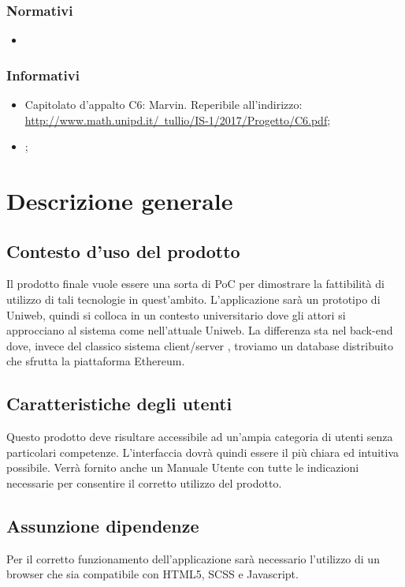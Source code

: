 \subsubsection{Normativi}
\begin{itemize}
	\item \textcolor{red}\NdP
\end{itemize}

\subsubsection{Informativi}
\begin{itemize}
	\item Capitolato d'appalto C6: Marvin. Reperibile all'indirizzo:\\ 
	\href{http://www.math.unipd.it/~tullio/IS-1/2017/Progetto/C6.pdf}{http://www.math.unipd.it/~tullio/IS-1/2017/Progetto/C6.pdf};
	\item \textcolor{red}\SdF;
\end{itemize}


\section{Descrizione generale}
	\subsection{Contesto d'uso del prodotto}
	Il prodotto finale vuole essere una sorta di PoC per dimostrare la fattibilità di utilizzo di tali tecnologie in
	quest’ambito. L’applicazione sarà un prototipo di Uniweb, quindi si colloca in un contesto universitario dove
	gli attori si approcciano al sistema come nell’attuale Uniweb. La differenza sta nel back-end dove, invece
	del classico sistema client/server , troviamo un database distribuito che sfrutta la piattaforma Ethereum.
	
	\subsection{Caratteristiche degli utenti}
	Questo prodotto deve risultare accessibile ad un'ampia categoria di utenti senza particolari competenze. L’interfaccia dovrà quindi essere il più chiara ed intuitiva possibile. Verrà fornito anche un Manuale Utente con tutte le indicazioni necessarie per consentire il corretto utilizzo del prodotto.
	
	\subsection{Assunzione dipendenze}
	Per il corretto funzionamento dell’applicazione sarà necessario l’utilizzo di un browser che sia compatibile con HTML5, SCSS e Javascript.

